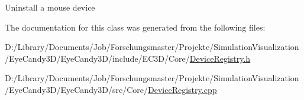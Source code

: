 Uninstall a mouse device 

The documentation for this class was generated from the following files\+:\begin{DoxyCompactItemize}
\item 
D\+:/\+Library/\+Documents/\+Job/\+Forschungsmaster/\+Projekte/\+Simulation\+Visualization/\+Eye\+Candy3\+D/\+Eye\+Candy3\+D/include/\+E\+C3\+D/\+Core/\mbox{\hyperlink{_device_registry_8h}{Device\+Registry.\+h}}\item 
D\+:/\+Library/\+Documents/\+Job/\+Forschungsmaster/\+Projekte/\+Simulation\+Visualization/\+Eye\+Candy3\+D/\+Eye\+Candy3\+D/src/\+Core/\mbox{\hyperlink{_device_registry_8cpp}{Device\+Registry.\+cpp}}\end{DoxyCompactItemize}
